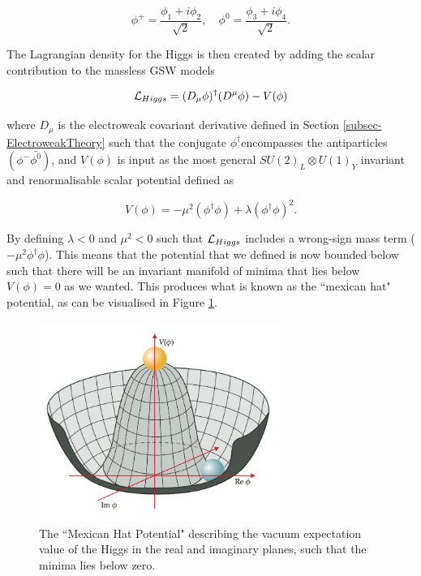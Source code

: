 \begin{equation}
\phi^+ = \frac{\phi_1 + i \phi_2}{\sqrt{2}}, \quad \phi^0 = \frac{\phi_3 + i\phi_4}{\sqrt{2}}.
\end{equation}

The Lagrangian density for the Higgs is then created by adding the scalar contribution to the massless GSW models

\begin{equation}
\mathcal{L}_{Higgs} = (D_{\mu}\phi)^{\dagger}(D^{\mu}\phi) - V(\phi)
\end{equation}

where $D_{\mu}$ is the electroweak covariant derivative defined in Section \ref{subsec-ElectroweakTheory} such that the conjugate $\phi^{\dagger}$encompasses the antiparticles $(\phi^-\bar{\phi^0})$, and $V(\phi)$ is input as the most general $SU(2)_L \otimes U(1)_Y$ invariant and renormalisable scalar potential defined as

\begin{equation}
V(\phi) = -\mu^2(\phi^{\dagger}\phi) + \lambda(\phi^{\dagger}\phi)^2.
\end{equation}

By defining $\lambda < 0$ and $\mu^2 < 0$ such that $\mathcal{L}_{Higgs}$ includes a wrong-sign mass term ($-\mu^2\phi^{\dagger}\phi$). This means that the potential that we defined is now bounded below such that there will be an invariant manifold of minima that lies below $V(\phi)=0$ as we wanted. This produces what is known as the ``mexican hat" potential, as can be visualised in Figure \ref{fig-MHP}.

\begin{figure} 
\begin{center}
\includegraphics[width=0.7\textwidth]{Figures/MexicanHatPotential.png}
\end{center}
\caption{The ``Mexican Hat Potential" describing the vacuum expectation value of the Higgs in the real and imaginary planes, such that the minima lies below zero.}
\label{fig-MHP}
\end{figure}

